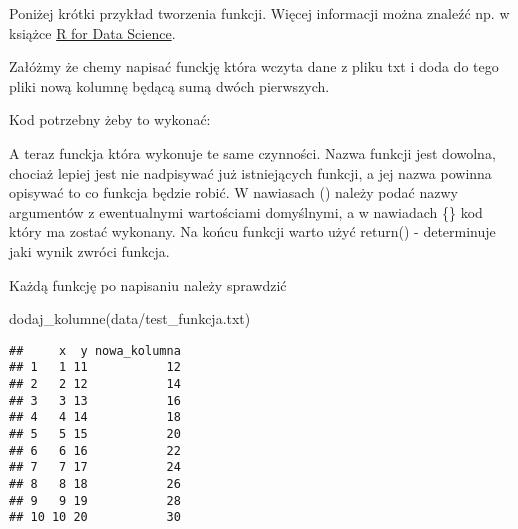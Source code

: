 \documentclass[
]{book}
\newenvironment{Shaded}{\begin{snugshade}}{\end{snugshade}}
\newcommand{\ControlFlowTok}[1]{\textcolor[rgb]{0.13,0.29,0.53}{\textbf{#1}}}
\newcommand{\FunctionTok}[1]{\textcolor[rgb]{0.00,0.00,0.00}{#1}}
\newcommand{\NormalTok}[1]{#1}
\newcommand{\OtherTok}[1]{\textcolor[rgb]{0.56,0.35,0.01}{#1}}
\newcommand{\SpecialCharTok}[1]{\textcolor[rgb]{0.00,0.00,0.00}{#1}}
\newcommand{\StringTok}[1]{\textcolor[rgb]{0.31,0.60,0.02}{#1}}
\begin{document}
Poniżej krótki przykład tworzenia funkcji. Więcej informacji można znaleźć np. w książce \href{https://r4ds.had.co.nz/functions.html}{R for Data Science}.

Załóżmy że chemy napisać funckję która wczyta dane z pliku txt i doda do tego pliki nową kolumnę będącą sumą dwóch pierwszych.

Kod potrzebny żeby to wykonać:

\begin{Shaded}
\end{Shaded}

A teraz funckja która wykonuje te same czynności. Nazwa funkcji jest dowolna, chociaż lepiej jest nie nadpisywać już istniejących funkcji, a jej nazwa powinna opisywać to co funkcja będzie robić. W nawiasach () należy podać nazwy argumentów z ewentualnymi wartościami domyślnymi, a w nawiadach \{\} kod który ma zostać wykonany. Na końcu funkcji warto użyć return() - determinuje jaki wynik zwróci funkcja.

\begin{Shaded}
\end{Shaded}

Każdą funkcję po napisaniu należy sprawdzić

\begin{Shaded}
\begin{Highlighting}[]
\FunctionTok{dodaj\_kolumne}\NormalTok{(}\StringTok{\textquotesingle{}data/test\_funkcja.txt\textquotesingle{}}\NormalTok{)}
\end{Highlighting}
\end{Shaded}

\begin{verbatim}
##     x  y nowa_kolumna
## 1   1 11           12
## 2   2 12           14
## 3   3 13           16
## 4   4 14           18
## 5   5 15           20
## 6   6 16           22
## 7   7 17           24
## 8   8 18           26
## 9   9 19           28
## 10 10 20           30
\end{verbatim}

  
\end{document}
